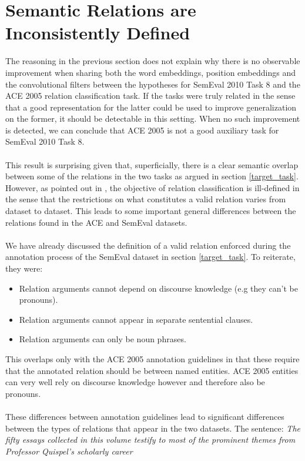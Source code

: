 \section{Semantic Relations are Inconsistently Defined}
The reasoning in the previous section does not explain why there is no observable improvement when sharing both the word embeddings, position embeddings and the convolutional filters between the hypotheses for SemEval 2010 Task 8 and the ACE 2005 relation classification task. If the tasks were truly related in the sense that a good representation for the latter could be used to improve generalization on the former, it should be detectable in this setting. When no such improvement is detected, we can conclude that ACE 2005 is not a good auxiliary task for SemEval 2010 Task 8.
\\\\
This result is surprising given that, superficially, there is a clear semantic overlap between some of the relations in the two tasks as argued in section \ref{target_task}. However, as pointed out in \citet{handschuh2016}, the objective of relation classification is ill-defined in the sense that the restrictions on what constitutes a valid relation varies from dataset to dataset. This leads to some important general differences between the relations found in the ACE and SemEval datasets.
\\\\
We have already discussed the definition of a valid relation enforced during the annotation process of the SemEval dataset in section \ref{target_task}. To reiterate, they were:
\begin{itemize}
	\item Relation arguments cannot depend on discourse knowledge (e.g they can't be pronouns).
	\item Relation arguments cannot appear in separate sentential clauses.
	\item Relation arguments can only be noun phrases.
\end{itemize}
This overlaps only with the ACE 2005 annotation guidelines in that these require that the annotated relation should be between named entities. ACE 2005 entities can very well rely on discourse knowledge however and therefore also be pronouns.
\\\\
These differences between annotation guidelines lead to significant differences between the types of relations that appear in the two datasets. The sentence: \textit{The fifty essays collected in this volume testify to most of the prominent themes from Professor Quispel's scholarly career}
